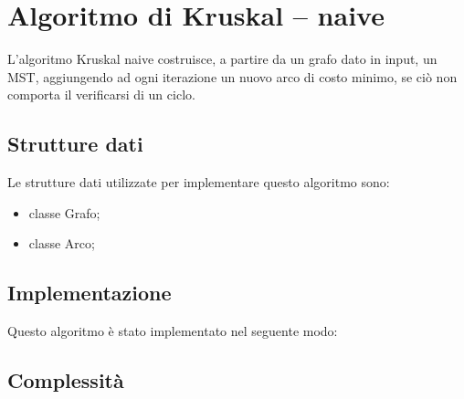\section{Algoritmo di Kruskal -- naive}
\label{Algoritmo_di_Kruskal-naive}

L'algoritmo Kruskal naive costruisce, a partire da un grafo dato in input, un MST, aggiungendo ad ogni iterazione un nuovo arco di costo minimo, se ciò non comporta il verificarsi di un ciclo.

\subsection{Strutture dati}
\label{strutture_dati}

Le strutture dati utilizzate per implementare questo algoritmo sono:

\begin{itemize}
    \item classe Grafo;
    \item classe Arco;
\end{itemize}

\subsection{Implementazione}
\label{implementazione}

Questo algoritmo è stato implementato nel seguente modo:

\subsection{Complessità}
\label{complessità}